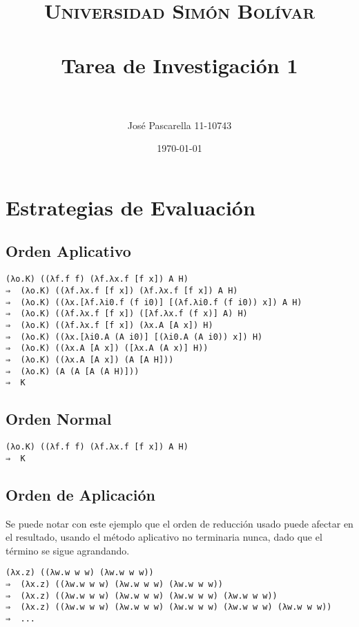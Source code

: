 \documentclass[11pt, spanish]{scrartcl}
\title{	
\normalfont \normalsize 
\textsc{Universidad Simón Bolívar} \\ [25pt] %
\horrule{0.5pt} \\[0.4cm] %
\huge Tarea de Investigación 1 \\ %
\horrule{2pt} \\[0.5cm] %
}
\author{José Pascarella
		11-10743} %
\date{\normalsize\today} %
\numberwithin{equation}{section} %
\numberwithin{figure}{section} %
\numberwithin{table}{section} %
\begin{document}
\maketitle %





\section{Estrategias de Evaluación}

\subsection{Orden Aplicativo}

\begin{lstlisting}[language=Lambda]
(λo.K) ((λf.f f) (λf.λx.f [f x]) A H)
⇒  (λo.K) ((λf.λx.f [f x]) (λf.λx.f [f x]) A H)
⇒  (λo.K) ((λx.[λf.λi0.f (f i0)] [(λf.λi0.f (f i0)) x]) A H)
⇒  (λo.K) ((λf.λx.f [f x]) ([λf.λx.f (f x)] A) H)
⇒  (λo.K) ((λf.λx.f [f x]) (λx.A [A x]) H)
⇒  (λo.K) ((λx.[λi0.A (A i0)] [(λi0.A (A i0)) x]) H)
⇒  (λo.K) ((λx.A [A x]) ([λx.A (A x)] H))
⇒  (λo.K) ((λx.A [A x]) (A [A H]))
⇒  (λo.K) (A (A [A (A H)]))
⇒  K
\end{lstlisting}


\subsection{Orden Normal}

\begin{lstlisting}[language=Lambda]
(λo.K) ((λf.f f) (λf.λx.f [f x]) A H)
⇒  K
\end{lstlisting}

\newpage

\subsection{Orden de Aplicación}

Se puede notar con este ejemplo que el orden de reducción usado puede afectar en el resultado, usando el método aplicativo
no terminaria nunca, dado que el término se sigue agrandando.

\begin{lstlisting}[language=Lambda]
(λx.z) ((λw.w w w) (λw.w w w))
⇒  (λx.z) ((λw.w w w) (λw.w w w) (λw.w w w))
⇒  (λx.z) ((λw.w w w) (λw.w w w) (λw.w w w) (λw.w w w))
⇒  (λx.z) ((λw.w w w) (λw.w w w) (λw.w w w) (λw.w w w) (λw.w w w))
⇒  ...
\end{lstlisting}
\end{document}
